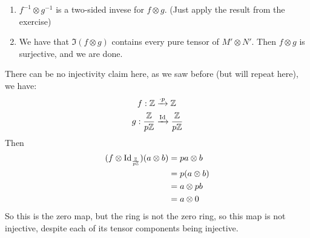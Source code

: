 \documentclass{article}
\begin{document}
    \proof \hspace{0.1cm} \begin{enumerate}
        \item $f^{-1} \otimes g^{-1}$ is a two-sided invese for $f \otimes g$. (Just apply the result from the exercise)
        \item We have that $\Im(f \otimes g)$ contains every pure tensor of $M' \otimes N'$. Then $f \otimes g$ is surjective, and we are done.
    \end{enumerate}
    \endproof
    There can be no injectivity claim here, as we saw before (but will repeat here), we have:
    \begin{align*}
        f: \mathbb{Z} &\xrightarrow{ \cdot p} \mathbb{Z}\\
        g: \frac{\mathbb{Z}}{p \mathbb{Z}} &\xrightarrow{\operatorname{Id}} \frac{\mathbb{Z}}{p \mathbb{Z}}
    \end{align*}
    Then \begin{align*}
        (f \otimes \operatorname{Id}_{\frac{\mathbb{Z}}{p \mathbb{Z}}})(a \otimes b) &= pa \otimes b\\
        &= p(a\otimes b)\\
        &= a \otimes pb\\
        &=a \otimes 0
    \end{align*}
    So this is the zero map, but the ring is not the zero ring, so this map is not injective, despite each of its tensor components being injective.
\end{document}
